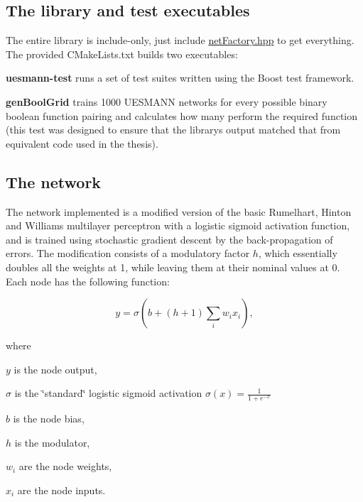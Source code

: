 \subsection*{The library and test executables}

The entire library is include-\/only, just include \hyperlink{netFactory_8hpp}{net\+Factory.\+hpp} to get everything. The provided C\+Make\+Lists.\+txt builds two executables\+:


\begin{DoxyItemize}
\item {\bfseries uesmann-\/test} runs a set of test suites written using the Boost test framework.
\item {\bfseries gen\+Bool\+Grid} trains 1000 U\+E\+S\+M\+A\+NN networks for every possible binary boolean function pairing and calculates how many perform the required function (this test was designed to ensure that the library\textquotesingle{}s output matched that from equivalent code used in the thesis).
\end{DoxyItemize}

\subsection*{The network}

The network implemented is a modified version of the basic Rumelhart, Hinton and Williams multilayer perceptron with a logistic sigmoid activation function, and is trained using stochastic gradient descent by the back-\/propagation of errors. The modification consists of a modulatory factor $h$, which essentially doubles all the weights at 1, while leaving them at their nominal values at 0. Each node has the following function\+:

\[ y = \sigma\left(b+(h+1)\sum_i w_i x_i\right), \]

where


\begin{DoxyItemize}
\item $y$ is the node output,
\item $\sigma$ is the \char`\"{}standard\char`\"{} logistic sigmoid activation $\sigma(x) = \frac{1}{1+e^{-x}}$
\item $b$ is the node bias,
\item $h$ is the modulator,
\item $w_i$ are the node weights,
\item $x_i$ are the node inputs.
\end{DoxyItemize}

